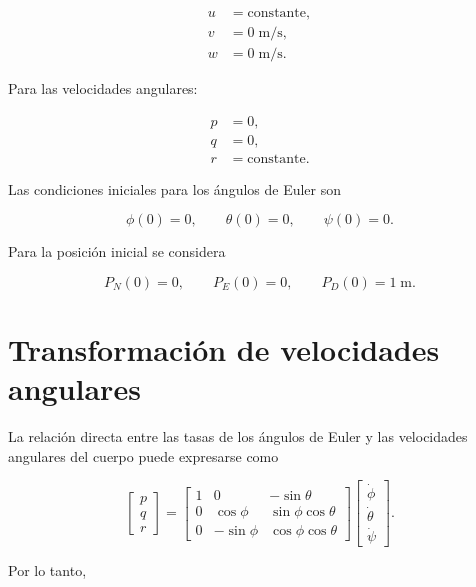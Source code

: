 \documentclass[11pt,a4paper]{article}
\begin{document}
\begin{align}
u &= \text{constante},\\
v &= 0\;\text{m/s},\\
w &= 0\;\text{m/s}.
\end{align}

Para las velocidades angulares:

\begin{align}
p &= 0,\\
q &= 0,\\
r &= \text{constante}.
\end{align}

Las condiciones iniciales para los ángulos de Euler son

\begin{equation}
\phi(0)=0,\qquad
\theta(0)=0,\qquad
\psi(0)=0.
\end{equation}

Para la posición inicial se considera

\begin{equation}
P_N(0)=0,\qquad
P_E(0)=0,\qquad
P_D(0)=1\;\text{m}.
\end{equation}


\section*{Transformación de velocidades angulares}

La relación directa entre las tasas de los ángulos de Euler y las
velocidades angulares del cuerpo puede expresarse como

\begin{equation}
\begin{bmatrix}
p\\
q\\
r
\end{bmatrix}
=
\begin{bmatrix}
1 & 0 & -\sin\theta\\
0 & \cos\phi & \sin\phi\cos\theta\\
0 & -\sin\phi & \cos\phi\cos\theta
\end{bmatrix}
\begin{bmatrix}
\dot{\phi}\\
\dot{\theta}\\
\dot{\psi}
\end{bmatrix}.
\end{equation}

Por lo tanto,
\end{document}

